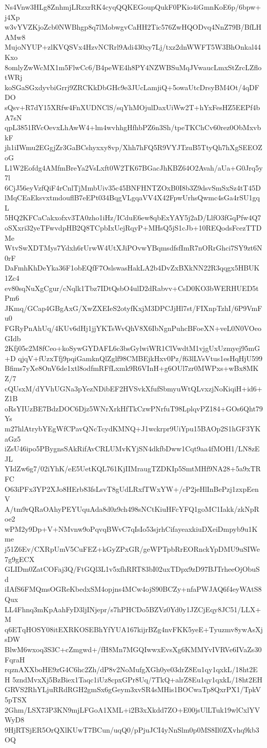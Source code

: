 Ns4Vnw3HLg8ZnhmjLRzxrRK4cyqQQKEGoupQukF0PKio4iGmnKoE6p/6bpw+j4Xp
w3vYVZKjoZcb0NWBhgp8q7lMobwgvCaHH2Tic576ZwHQODvq4NnZ79B/BfLHAMw8
MujoNYUP+zlKVQSVx4HzvNCRrl9Adi430xy7Lj/txz2dnWWFT5W3BhOnkal44Kxo
8omlyZwWcMX1m5FlwCc6/B4peWE4h8PY4NZWBSuMqJVwaucLmxStZrcLZflotWRj
koSGaSGxdyvbiGrrj9ZRCKkDbGHc9e3JUcLamjiQ+5owaUtcDrsyBM4Ot/4qDFDO
sQsv+R7dY15XRfw4FnXUDNClS/sqYhMOjulDaxUiWw2T+hYxFesHZ5EEPf4bA7sN
qpL3851RVcOevxLhAwW4+lm4wvhhgHfhbPZ6n3Sh/tpeTKChCv60rez0ObMxvbkF
jh1iIWmu2EGgjZr3GaBCshyxxy8vp/Xhh7hFQ5R9VYJTzuB5TtyQh7hXgSEEOZoG
L1W2Eofdg4AMfmBreYa2VsLxft0W2TK67BGacJhKBZ64O2Avah/aUa+G0Jrq5y7l
6CjJ56eyVzfQiF4rCnlTjMmbUiv35c45BNFHNTZOxB0I8b3Z9dsvSmSxSz4tT45D
lMqCEaEksvxtmdouflB7eEPt034BqgVLgqaVV4X42FpwUrhsQwmc4sGa4rSU1gqL
5HQ2KFCaCakxofxv3TA0zho1iHz/ICduE6ew8qbExYAY5j2aD/LlfO3fGqPfw4Q7
oSXxri32yeTFwvdpHB2Q8TCpbIxUejRqyP+MHsQ5jS1cJb+10REQodsFcezTTDMe
WtvSwXDTMys7Ydxh6rUrwW4UtXJiPOvwYBqmsdfsfImR7nORrGhci7SY9zt6N0rF
DaFmhKhDeYka36F1obEQfF7OslswasHakLA2b4DvZxBXkNN22R3qqgx5HBUK1Zc4
ev80sqNuXgCgur/cNqlk1Tbz7IDtQsbO4ulD2dRabvv+CsD0KO3bWERHUED5tPm6
JKmq/GCap4GBgAxG/XwZXEIeS2otyfKxjM3DPCJjHl7st/FIXnpTzhI/6P9VmFu0
FGRyPnAhUq/4KUv6dHj1jjYKTsWvQhV8X6IbNgnPuhcBFoeXN+veL0N0VOeoGIdb
2Kfj05c2M8fCeo+koSywGYDAFL6c3bsGylwiWR1ClVwdtM1vjgUxUzmyej95mG+D
qjqV+fUzxTfj9pqiGamknQlZglf98CMBEjkHxv0Pz/f63lLVsVtus1esHqHjU599
Bfims7yXe8OnV6de1xtl8odfmRFfLxmk9R6VInH+g6OUl7zr0MWPxs+wBx8MKZ/7
cQUsxM/dYVhUGNa3pYezNDibEF2HVSvkXfufSbmyuWtQLvxzjNoKiqiH+id6+Z1B
oRsYIUzBE7BdzDOC6Djz5WNrXrkHfTkCzwPNrfuT98LplqvPZ184+GOs6Qht79Ys
m27hlAtrybYEgWfCPavQNcTcydKMNQ+J1wckrpr9UiYpu15BAOp2S1hGF3YKaGz5
iZsU46ipo5PBygnsSAkRifAvCRLUMvKYjSN4dkfbDww1Cqt9aa4fMOH1/LN8zEJL
YIdZw6g7/02iYhK/eE5UetKQL761KjIIMraugTZDKIp5SmtMHf9NA28+5a9xTRFC
O63iPFx3YP2XJo8HErb83fsLsvT8gUdLRxfTWxYW+/cP2jeHlInBePzj1zxpEenV
A/tm9rQRaOAhyPEYUquAda8d0z9ch498sNCtKiuHFcYFQ1goMC1Iakk/zkNpRoe2
wPM2y9Dp+V+NMvnw9oPqvqBWvC7qIsIo53sjrhCifayeaxkiuDXeiDmpyb9u1Kme
j51Z6Ev/CXRpUmV5CuFEZ+kGyZPxGR/geWPTpbRrEORnckYpDMU9uSIWe7g9gECX
GLIDm0ZatCOFaj3Q/FtGQl3L1v5xfhRRT83bI02uxTDpx9zD97BJTrheeOjObuSd
iIAfS6FMQmsOGReKbedxSM4opjns4MCw4ojS90BCZy+nfaPWJAQ6f4eyWAtS8Qux
LL4Fhnq3mKpAahFyD3ljINjepr/s7hPHCDo5BZVz0Yd0y1JZCjEqy8JC51/LLX+M
q6ETqHOSY08itEXRKOSEBhYfYUA167kijrBZg4nvFKK5yeE+Tyuzmv8ywAsXjsDW
BlwM6wxoq3S3C+cZmgwd+/fH8Mn7MGQIwwxEvsXg6KMMYvIVRVe6IVaZs30FqraH
rqznAXXboHE9zG4C6hc2Zh/dP8v2NoMufgXGh0ye03drZ8Eu1qy1qxkL/18ht2EH
5zndMvxXj5BzBiex1Taqc1iUz8cpxGPr8Uq/7TkQ+alrZ8Eu1qy1qxkL/18ht2EH
GRVS2RhYLjuRRdRGH2gmSx6gGeym3xvSR4sMHis1BOCwaTp8QxrPX1/TpkV5pTSX
2Ghm/LSX73P3KN9mjLFGoA1XML+i2B3xXkdd7ZO+E00jsUlLTuk19wlCxlYVWyD8
9HjRTSjER5OrQXlKUwT7BCun/uqQ0/pPjuJCI4yNnSlm0p0MS8Il0ZXvhq9kb3OQ
